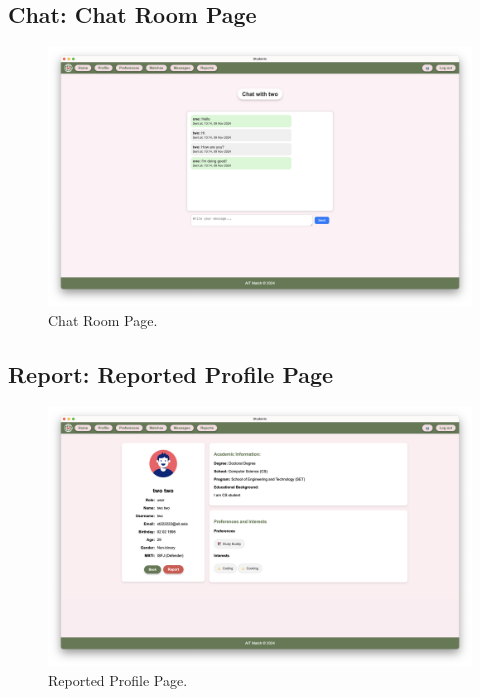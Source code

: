         \subsection{Chat: Chat Room Page}
        \begin{figure}[h]
                \centering
                \captionsetup{justification=centering, singlelinecheck=false, labelsep=space}
                \includegraphics[width=5in]{figures/results/chat/chat-room-page.png} 
                \caption{Chat Room Page.}
                \label{fig:no-conversation-page.png}
            \end{figure}
        \newpage
        \subsection{Report: Reported Profile Page}
        \begin{figure}[h]
                \centering
                \captionsetup{justification=centering, singlelinecheck=false, labelsep=space}
                \includegraphics[width=5in]{figures/results/reports/reported-profile-page.png} 
                \caption{Reported Profile Page.}
                \label{fig:reported-profile-page}
            \end{figure}

